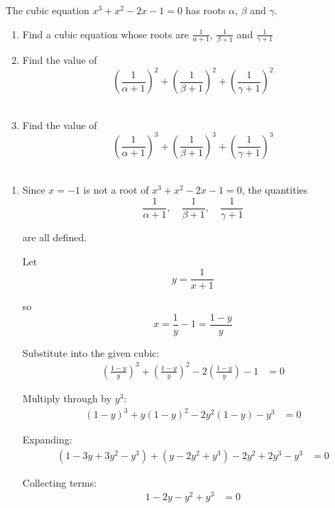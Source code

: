 \documentclass[leqno]{article}
\begin{document}
\begin{enumerate}[
  label=\textbf{\arabic*.},
  leftmargin=*,
  topsep=0pt,
  partopsep=0pt,
  parsep=0pt
]
\questionitem

The cubic equation $x^3 + x^2 - 2x - 1 = 0$ has roots $\alpha$, $\beta$ and $\gamma$. \\

\begin{enumerate}[label=\textbf{(\alph*)}]
  \item Find a cubic equation whose roots are $\frac{1}{\alpha+1}$, $\frac{1}{\beta+1}$ and $\frac{1}{\gamma+1}$  \\
  \item Find the value of \[\left(\frac{1}{\alpha+1}\right)^2 + \left(\frac{1}{\beta+1}\right)^2 + \left(\frac{1}{\gamma+1}\right)^2\]  \\
  \item Find the value of \[\left(\frac{1}{\alpha+1}\right)^3 + \left(\frac{1}{\beta+1}\right)^3 + \left(\frac{1}{\gamma+1}\right)^3\]  \\
\end{enumerate}

\vspace*{10pt}

\begin{djsSolution}
\begin{enumerate}[label=\textbf{(\alph*)}]
  \item Since $x=-1$ is not a root of $x^3+x^2-2x-1=0$, the quantities
  \[
  \frac{1}{\alpha+1},\quad \frac{1}{\beta+1},\quad \frac{1}{\gamma+1}
  \]

  are all defined.

  Let
  \[
  y=\frac{1}{x+1}
  \]

  so
  \[
  x=\frac{1}{y}-1=\frac{1-y}{y}
  \]

  Substitute into the given cubic:
  \begin{align*}
  \left(\frac{1-y}{y}\right)^3+\left(\frac{1-y}{y}\right)^2-2\left(\frac{1-y}{y}\right)-1&=0
  \end{align*}

  Multiply through by $y^3$:
  \begin{align*}
  (1-y)^3+y(1-y)^2-2y^2(1-y)-y^3&=0
  \end{align*}

  Expanding:
  \begin{align*}
  (1-3y+3y^2-y^3)+(y-2y^2+y^3)-2y^2+2y^3-y^3&=0
  \end{align*}

  Collecting terms:
  \begin{align*}
  1-2y-y^2+y^3&=0
  \end{align*}


\end{enumerate}
\end{djsSolution}
\end{enumerate}
\end{document}
